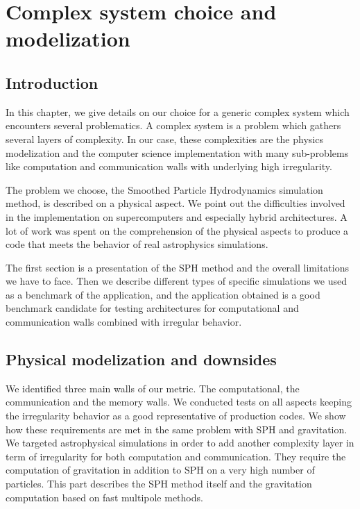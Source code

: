 \chapter{Complex system choice and modelization}

\section{Introduction}
In this chapter, we give details on our choice for a generic complex system which encounters several problematics. 
A complex system is a problem which gathers several layers of complexity. 
In our case, these complexities are the physics modelization and the computer science implementation with many sub-problems like computation and communication walls with underlying high irregularity. 
 
The problem we choose, the Smoothed Particle Hydrodynamics simulation method, is described on a physical aspect.
We point out the difficulties involved in the implementation on supercomputers and especially hybrid architectures.  
A lot of work was spent on the comprehension of the physical aspects to produce a code that meets the behavior of real astrophysics simulations.

The first section is a presentation of the SPH method and the overall limitations we have to face. 
Then we describe different types of specific simulations we used as a benchmark of the application, and the application obtained is a good benchmark candidate for testing architectures for computational and communication walls combined with irregular behavior.

\section{Physical modelization and downsides}
We identified three main walls of our metric.
The computational, the communication and the memory walls.
We conducted tests on all aspects keeping the irregularity behavior as a good representative of production codes.
We show how these requirements are met in the same problem with SPH and gravitation.
We targeted astrophysical simulations in order to add another complexity layer in term of irregularity for both computation and communication. 
They require the computation of gravitation in addition to SPH on a very high number of particles. 
This part describes the SPH method itself and the gravitation computation based on fast multipole methods. 

